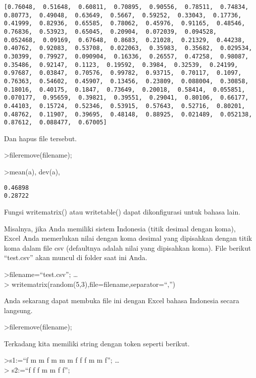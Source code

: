 \documentclass[
]{book}
\begin{document}
\begin{verbatim}
[0.76048,  0.51648,  0.60811,  0.70895,  0.90556,  0.78511,  0.74834,
0.80773,  0.49048,  0.63649,  0.5667,  0.59252,  0.33043,  0.17736,
0.41999,  0.82936,  0.65585,  0.78062,  0.45976,  0.91165,  0.48546,
0.76836,  0.53923,  0.65045,  0.20904,  0.072039,  0.094528,
0.052468,  0.09169,  0.67648,  0.8683,  0.21028,  0.21329,  0.44238,
0.40762,  0.92083,  0.53708,  0.022063,  0.35983,  0.35682,  0.029534,
0.30399,  0.79927,  0.090904,  0.16336,  0.26557,  0.47258,  0.98087,
0.35486,  0.92147,  0.1123,  0.19592,  0.3984,  0.32539,  0.24199,
0.97687,  0.03847,  0.70576,  0.99782,  0.93715,  0.70117,  0.1097,
0.76363,  0.54602,  0.45907,  0.13456,  0.23809,  0.088004,  0.30858,
0.18016,  0.40175,  0.1847,  0.73649,  0.20018,  0.58414,  0.055851,
0.070177,  0.95659,  0.39821,  0.39551,  0.29041,  0.80106,  0.66177,
0.44103,  0.15724,  0.52346,  0.53915,  0.57643,  0.52716,  0.80201,
0.48762,  0.11907,  0.39695,  0.48148,  0.88925,  0.021489,  0.052138,
0.87612,  0.088477,  0.67005]
\end{verbatim}

Dan hapus file tersebut.

\textgreater fileremove(filename);

\textgreater mean(a), dev(a),

\begin{verbatim}
0.46898
0.28722
\end{verbatim}

Fungsi writematrix() atau writetable() dapat dikonfigurasi untuk bahasa lain.

Misalnya, jika Anda memiliki sistem Indonesia (titik desimal dengan koma), Excel Anda memerlukan nilai dengan koma desimal yang dipisahkan dengan titik koma dalam file csv (defaultnya adalah nilai yang dipisahkan koma). File berikut ``test.csv'' akan muncul di folder saat ini Anda.

\textgreater filename=``test.csv''; \ldots{}\\
\textgreater{} writematrix(random(5,3),file=filename,separator=``,'')

Anda sekarang dapat membuka file ini dengan Excel bahasa Indonesia secara langsung.

\textgreater fileremove(filename);

Terkadang kita memiliki string dengan token seperti berikut.

\textgreater s1:=``f m m f m m m f f f m m f''; \ldots{}\\
\textgreater{} s2:=``f f f m m f f'';
\end{document}
